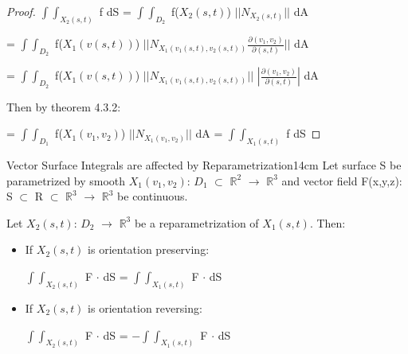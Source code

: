     \begin{proof}
        $\int \int_{X_2(s,t)}$ f dS
        = $\int \int_{D_2}$ f($X_2(s,t)$) $||N_{X_2(s,t)}||$ dA

        \hspace{2.4cm}
        = $\int \int_{D_2}$ f($X_1(v(s,t))$)
            $||N_{X_1(v_1(s,t),v_2(s,t))}
            \frac{\partial(v_1,v_2)}{\partial(s,t)}||$ dA
        
        \hspace{2.4cm}
        = $\int \int_{D_2}$ f($X_1(v(s,t))$)
            $||N_{X_1(v_1(s,t),v_2(s,t))}||$
            $|\frac{\partial(v_1,v_2)}{\partial(s,t)}|$ dA

        Then by {\color{red} theorem 4.3.2}:

        \hspace{2.4cm}
        = $\int \int_{D_1}$ f($X_1(v_1,v_2)$) $||N_{X_1(v_1,v_2)}||$ dA
        = $\int \int_{X_1(s,t)}$ f dS
    \end{proof}

    \vspace{0.5cm}



    \begin{wtheorem}{Vector Surface Integrals are affected
    by Reparametrization}{14cm}
        Let surface S be parametrized by smooth $X_1(v_1,v_2)$: $D_1$ $\subset$
        $\mathbb{R}^2$ $\rightarrow$ $\mathbb{R}^3$
        and vector field F(x,y,z): S $\subset$ R $\subset$ $\mathbb{R}^3$
        $\rightarrow$ $\mathbb{R}^3$ be continuous.

        Let $X_2(s,t)$: $D_2$ $\rightarrow$ $\mathbb{R}^3$
        be a reparametrization of $X_1(s,t)$. Then:

        \begin{itemize}[itemsep=0.1cm]
            \item If $X_2(s,t)$ is orientation preserving:
            
                \hspace{0.5cm}
                $\int \int_{X_2(s,t)}$ F $\cdot$ dS
                = $\int \int_{X_1(s,t)}$ F $\cdot$ dS
            
            \item If $X_2(s,t)$ is orientation reversing:
                
                \hspace{0.5cm}
                $\int \int_{X_2(s,t)}$ F $\cdot$ dS
                = $-\int \int_{X_1(s,t)}$ F $\cdot$ dS
        \end{itemize}
    \end{wtheorem}

